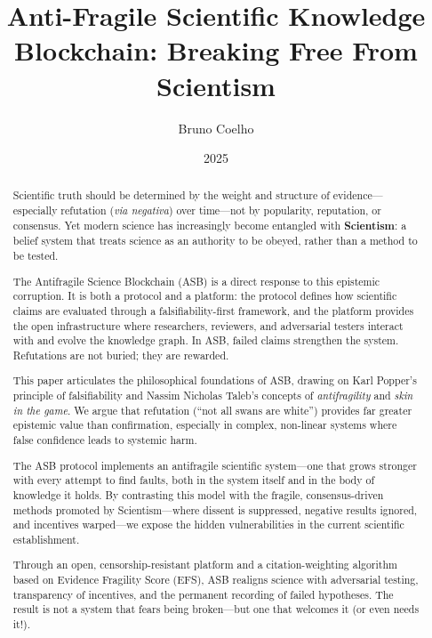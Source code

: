 \documentclass{article}
\title{Anti-Fragile Scientific Knowledge Blockchain: Breaking Free From Scientism}
\author{Bruno Coelho}
\date{2025}
\begin{document}
\maketitle

\clearpage
\tableofcontents
\clearpage

\begin{abstract}
Scientific truth should be determined by the weight and structure of evidence—especially refutation (\emph{via negativa}) over time—not by popularity, reputation, or consensus. Yet modern science has increasingly become entangled with \textbf{Scientism}: a belief system that treats science as an authority to be obeyed, rather than a method to be tested.

The Antifragile Science Blockchain (ASB) is a direct response to this epistemic corruption. It is both a protocol and a platform: the protocol defines how scientific claims are evaluated through a falsifiability-first framework, and the platform provides the open infrastructure where researchers, reviewers, and adversarial testers interact with and evolve the knowledge graph. In ASB, failed claims strengthen the system. Refutations are not buried; they are rewarded.

This paper articulates the philosophical foundations of ASB, drawing on Karl Popper's principle of falsifiability and Nassim Nicholas Taleb's concepts of \emph{antifragility} and \emph{skin in the game}. We argue that refutation (“not all swans are white”) provides far greater epistemic value than confirmation, especially in complex, non-linear systems where false confidence leads to systemic harm.

The ASB protocol implements an antifragile scientific system—one that grows stronger with every attempt to find faults, both in the system itself and in the body of knowledge it holds. By contrasting this model with the fragile, consensus-driven methods promoted by Scientism—where dissent is suppressed, negative results ignored, and incentives warped—we expose the hidden vulnerabilities in the current scientific establishment.

Through an open, censorship-resistant platform and a citation-weighting algorithm based on Evidence Fragility Score (EFS), ASB realigns science with adversarial testing, transparency of incentives, and the permanent recording of failed hypotheses. The result is not a system that fears being broken—but one that welcomes it (or even needs it!).
\end{abstract}
\end{document}
